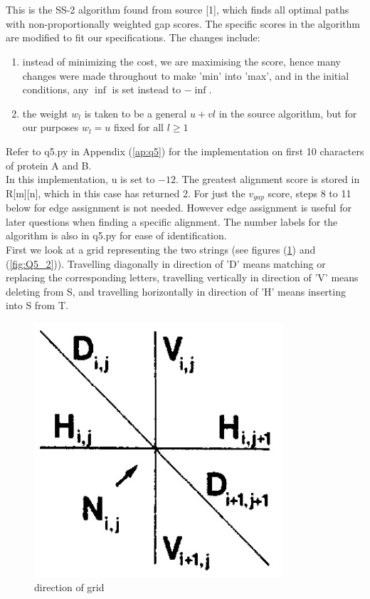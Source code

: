 \documentclass{article}
\begin{document}
	\section{}
	This is the SS-2 algorithm found from source [1], which finds all optimal paths with non-proportionally weighted gap scores.
	The specific scores in the algorithm are modified to fit our specifications. The changes include:
	\begin{enumerate}
		\item instead of minimizing the cost, we are maximising the score, hence many changes were made throughout to make 'min' into 'max', and in the initial conditions, any $ \inf $ is set instead to $ -\inf $.
		\item the weight $ w_l $ is taken to be a general $ u + vl $ in the source algorithm, but for our purposes $ w_l = u $ fixed for all $ l \geq 1 $
	\end{enumerate}
	Refer to q5.py in Appendix (\ref{ap:q5}) for the implementation on first 10 characters of protein A and B.\\
	In this implementation, u is set to $ -12 $. The greatest alignment score is stored in R[m][n], which in this case has returned 2.
	For just the $v_{gap}$ score, steps 8 to 11 below for edge assignment is not needed. However edge assignment is useful for later questions when finding a specific alignment.
	The number labels for the algorithm is also in q5.py for ease of identification.\\
	First we look at a grid representing the two strings (see figures (\ref{fig:Q5_1}) and (\ref{fig:Q5_2})). Travelling diagonally in direction of 'D' means matching or replacing the corresponding letters, travelling vertically in direction of 'V' means deleting from S, and travelling horizontally in direction of 'H' means inserting into S from T.
	\begin{figure}[h]
		\centering
		\includegraphics{figures/q5_1.jpg}
		\caption{direction of grid}
		\label{fig:Q5_1}
		
	\end{figure}
\end{document}
